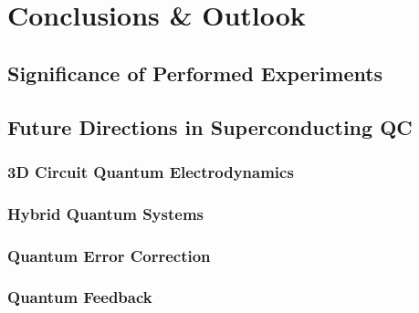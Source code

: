 \chapter{Conclusions \& Outlook}

\section{Significance of Performed Experiments}

\section{Future Directions in Superconducting QC}

\subsection{3D Circuit Quantum Electrodynamics}

\subsection{Hybrid Quantum Systems}

\subsection{Quantum Error Correction}

\subsection{Quantum Feedback}
